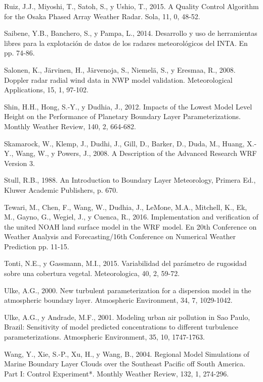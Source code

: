 \documentclass[12pt,spanish,oneside]{book}
\begin{document}
\hypertarget{ref-Ruiz2015}{}
Ruiz, J.J., Miyoshi, T., Satoh, S., y Ushio, T., 2015. A Quality Control
Algorithm for the Osaka Phased Array Weather Radar. Sola, 11, 0, 48-52.

\hypertarget{ref-Saibene2014}{}
Saibene, Y.B., Banchero, S., y Pampa, L., 2014. Desarrollo y uso de
herramientas libres para la explotación de datos de los radares
meteorológicos del INTA. En pp. 74-86.

\hypertarget{ref-Salonen2008}{}
Salonen, K., Järvinen, H., Järvenoja, S., Niemelä, S., y Eresmaa, R.,
2008. Doppler radar radial wind data in NWP model validation.
Meteorological Applications, 15, 1, 97-102.

\hypertarget{ref-Shin2012}{}
Shin, H.H., Hong, S.-Y., y Dudhia, J., 2012. Impacts of the Lowest Model
Level Height on the Performance of Planetary Boundary Layer
Parameterizations. Monthly Weather Review, 140, 2, 664-682.

\hypertarget{ref-Skamarock2008}{}
Skamarock, W., Klemp, J., Dudhi, J., Gill, D., Barker, D., Duda, M.,
Huang, X.-Y., Wang, W., y Powers, J., 2008. A Description of the
Advanced Research WRF Version 3.

\hypertarget{ref-Stull1988}{}
Stull, R.B., 1988. An Introduction to Boundary Layer Meteorology,
Primera Ed., Kluwer Academic Publishers, p. 670.

\hypertarget{ref-Tewari2004}{}
Tewari, M., Chen, F., Wang, W., Dudhia, J., LeMone, M.A., Mitchell, K.,
Ek, M., Gayno, G., Wegiel, J., y Cuenca, R., 2016. Implementation and
verification of the united NOAH land surface model in the WRF model. En
20th Conference on Weather Analysis and Forecasting/16th Conference on
Numerical Weather Prediction pp. 11-15.

\hypertarget{ref-Tonti2015}{}
Tonti, N.E., y Gassmann, M.I., 2015. Variabilidad del parámetro de
rugosidad sobre una cobertura vegetal. Meteorologica, 40, 2, 59-72.

\hypertarget{ref-Ulke2000}{}
Ulke, A.G., 2000. New turbulent parameterization for a dispersion model
in the atmospheric boundary layer. Atmospheric Environment, 34, 7,
1029-1042.

\hypertarget{ref-Ulke2001}{}
Ulke, A.G., y Andrade, M.F., 2001. Modeling urban air pollution in Sao
Paulo, Brazil: Sensitivity of model predicted concentrations to
different turbulence parameterizations. Atmospheric Environment, 35, 10,
1747-1763.

\hypertarget{ref-Wang2004}{}
Wang, Y., Xie, S.-P., Xu, H., y Wang, B., 2004. Regional Model
Simulations of Marine Boundary Layer Clouds over the Southeast Pacific
off South America. Part I: Control Experiment*. Monthly Weather Review,
132, 1, 274-296.
\end{document}
